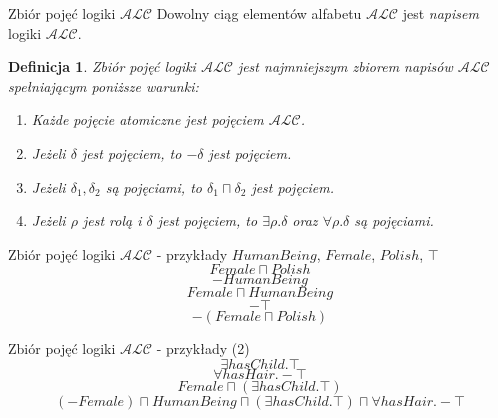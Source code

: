 \documentclass{beamer}
\newtheorem{definicja}{Definicja}
\begin{document}
\begin{frame}{Zbiór pojęć logiki $\mathcal{ALC}$}
%
Dowolny ciąg elementów alfabetu $\mathcal{ALC}$ jest \emph{napisem} logiki $\mathcal{ALC}$.
%
\begin{definicja}
\label{CONCEPTAL}
Zbiór pojęć logiki $\mathcal{ALC}$ jest najmniejszym zbiorem napisów $\mathcal{ALC}$ spełniającym poniższe warunki:
%
\begin{enumerate}
\item Każde pojęcie atomiczne jest pojęciem $\mathcal{ALC}$.
%
\item Jeżeli $\delta$ jest pojęciem, to $- \delta$ jest pojęciem.
%
\item Jeżeli $\delta_{1}, \delta_{2}$ są pojęciami, to $\delta_{1} \sqcap \delta_{2}$ jest pojęciem.
%
\item Jeżeli $\rho$ jest rolą i $\delta$ jest pojęciem, to $\exists \rho. \delta$ oraz $\forall \rho . \delta$ są pojęciami.
\end{enumerate}
\end{definicja}
\end{frame}

\begin{frame}{Zbiór pojęć logiki $\mathcal{ALC}$ - przykłady}
%
$HumanBeing$, $Female$, $Polish$, $\top$\\
%
$$Female \sqcap Polish$$
%
$$- HumanBeing$$
%
$$Female \sqcap HumanBeing$$
%
$$- \top$$
%
$$-(Female \sqcap Polish)$$
\end{frame}

\begin{frame}{Zbiór pojęć logiki $\mathcal{ALC}$ - przykłady (2)}
%
$$\exists hasChild . \top$$
%
$$\forall hasHair . - \top$$
%
$$Female \sqcap (\exists hasChild . \top)$$
%
$$(- Female) \sqcap HumanBeing \sqcap (\exists hasChild . \top) \sqcap \forall hasHair . - \top$$
\end{frame}
\end{document}
